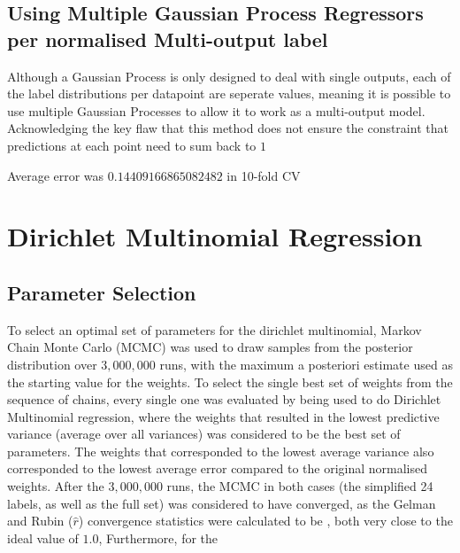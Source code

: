 \subsection{Using Multiple Gaussian Process Regressors per normalised Multi-output label}
Although a Gaussian Process is only designed to deal with single outputs, each of the label distributions per datapoint are seperate values, meaning it is possible to use multiple Gaussian Processes to allow it to work as a multi-output model. Acknowledging the key flaw that this method does not ensure the constraint that predictions at each point need to sum back to $1$ 

Average error was $0.14409166865082482$ in 10-fold CV


\section{Dirichlet Multinomial Regression}


\subsection{Parameter Selection}

To select an optimal set of parameters for the dirichlet multinomial, Markov Chain Monte Carlo (MCMC) was used to draw samples from the posterior distribution  over $3,000,000$ runs, with the maximum a posteriori estimate used as the starting value for the weights. To select the single best set of weights from the sequence of chains, every single one was evaluated by being used to do Dirichlet Multinomial regression, where the weights that resulted in the lowest predictive variance (average over all variances) was considered to be the best set of parameters. The weights that corresponded to the lowest average variance also corresponded to the lowest average error compared to the original normalised weights. After the $3,000,000$ runs, the MCMC in both cases (the simplified 24 labels, as well as the full set) was considered to have converged, as the Gelman and Rubin ($\hat{r}$) convergence statistics were calculated to be , both very close to the ideal value of $1.0$, Furthermore, for the 

